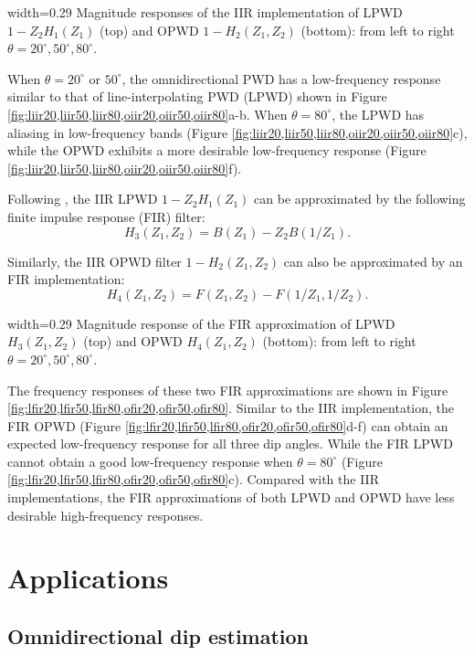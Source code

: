 {width=0.29\textwidth}{
Magnitude responses of the IIR implementation of
LPWD $1-Z_2H_1(Z_1)$ (top) and
OPWD $1-H_2(Z_1,Z_2)$ (bottom): 
from left to right $\theta=20^\circ,50^\circ,80^\circ$.
}


When $\theta=20^\circ$ or $50^\circ$,
the omnidirectional PWD has a low-frequency response similar to that
of line-interpolating PWD (LPWD)
shown in Figure \ref{fig:liir20,liir50,liir80,oiir20,oiir50,oiir80}a-b.
When $\theta=80^\circ$, the LPWD has 
aliasing in low-frequency bands
(Figure \ref{fig:liir20,liir50,liir80,oiir20,oiir50,oiir80}c),
while the OPWD exhibits a more desirable low-frequency response
(Figure \ref{fig:liir20,liir50,liir80,oiir20,oiir50,oiir80}f).

Following \cite{fomel:1946},
the IIR LPWD $1-Z_2H_1(Z_1)$ can be approximated by the following 
finite impulse response (FIR) filter:
\begin{equation}
H_3(Z_1,Z_2)=B(Z_1)-Z_2B(1/Z_1).
\end{equation}

Similarly, the IIR OPWD filter $1-H_2(Z_1,Z_2)$
can also be approximated by an FIR implementation:
\begin{equation}\label{eq:pwd:h4}
H_4(Z_1,Z_2)=F(Z_1,Z_2)-F(1/Z_1,1/Z_2).
\end{equation}

{width=0.29\textwidth}{
Magnitude response of the FIR approximation of
LPWD $H_3(Z_1,Z_2)$ (top) and
OPWD $H_4(Z_1,Z_2)$ (bottom):
from left to right $\theta=20^\circ,50^\circ,80^\circ$.
}

The frequency responses of these two FIR approximations
are shown in Figure \ref{fig:lfir20,lfir50,lfir80,ofir20,ofir50,ofir80}.
Similar to the IIR implementation, 
the FIR OPWD (Figure \ref{fig:lfir20,lfir50,lfir80,ofir20,ofir50,ofir80}d-f)
can obtain an expected low-frequency response
for all three dip angles.
While the FIR LPWD cannot obtain a good low-frequency response 
when $\theta=80^\circ$
(Figure \ref{fig:lfir20,lfir50,lfir80,ofir20,ofir50,ofir80}c). 
Compared with the IIR implementations, 
the FIR approximations of both LPWD and OPWD have 
less desirable high-frequency responses.

\section{Applications}

\subsection{Omnidirectional dip estimation}

